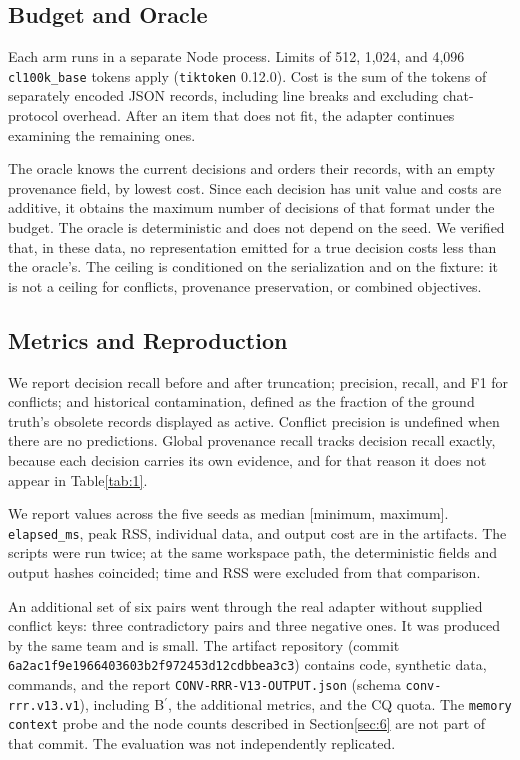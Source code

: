 \documentclass[11pt,a4paper]{article}
\begin{document}
\subsection{Budget and Oracle}\label{sec:4.2}
Each arm runs in a separate Node process. Limits of 512, 1,024, and 4,096 \texttt{cl100k\_base} tokens apply (\texttt{tiktoken} 0.12.0). Cost is the sum of the tokens of separately encoded JSON records, including line breaks and excluding chat-protocol overhead. After an item that does not fit, the adapter continues examining the remaining ones.

The oracle knows the current decisions and orders their records, with an empty provenance field, by lowest cost. Since each decision has unit value and costs are additive, it obtains the maximum number of decisions of that format under the budget. The oracle is deterministic and does not depend on the seed. We verified that, in these data, no representation emitted for a true decision costs less than the oracle's. The ceiling is conditioned on the serialization and on the fixture: it is not a ceiling for conflicts, provenance preservation, or combined objectives.

\subsection{Metrics and Reproduction}\label{sec:4.3}
We report decision recall before and after truncation; precision, recall, and F1 for conflicts; and historical contamination, defined as the fraction of the ground truth's obsolete records displayed as active. Conflict precision is undefined when there are no predictions. Global provenance recall tracks decision recall exactly, because each decision carries its own evidence, and for that reason it does not appear in Table\nobreakspace{}\ref{tab:1}.

We report values across the five seeds as median [minimum, maximum]. \texttt{elapsed\_ms}, peak RSS, individual data, and output cost are in the artifacts. The scripts were run twice; at the same workspace path, the deterministic fields and output hashes coincided; time and RSS were excluded from that comparison.

An additional set of six pairs went through the real adapter without supplied conflict keys: three contradictory pairs and three negative ones. It was produced by the same team and is small. The artifact repository \cite{ref9} (commit \texttt{6a2ac1f9e1\allowbreak{}966403603b\allowbreak{}2f972453d1\allowbreak{}2cdbbea3c3}) contains code, synthetic data, commands, and the report \texttt{CONV-\allowbreak{}RRR-\allowbreak{}V13-\allowbreak{}OUTPUT.\allowbreak{}json} (schema \texttt{conv-\allowbreak{}rrr.\allowbreak{}v13.\allowbreak{}v1}), including B\ensuremath{^{\prime}}, the additional metrics, and the CQ quota. The \texttt{memory context} probe and the node counts described in Section\nobreakspace{}\ref{sec:6} are not part of that commit. The evaluation was not independently replicated.
\end{document}
